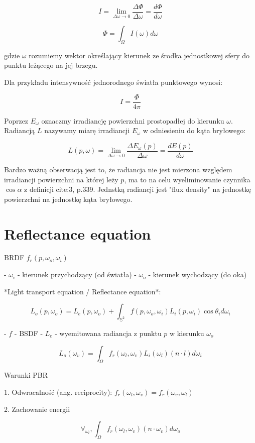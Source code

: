\documentclass[../main.tex]{subfiles}
\begin{document}
$$
I = \lim_{\Delta\omega \rightarrow 0} {
    \frac{\Delta\Phi}{\Delta\omega}
} = \frac{d\Phi}{d\omega}
$$

$$
\Phi = \int_{\Omega} {I(\omega) d\omega}
$$

gdzie $\omega$ rozumiemy wektor określający kierunek ze środka jednostkowej
sfery do punktu leżącego na jej brzegu.

Dla przykładu intensywność jednorodnego światła punktowego wynosi:

$$
I = \frac{\Phi}{4\pi}
$$

Poprzez $E_{\omega}$ oznaczmy irradiancję powierzchni prostopadłej do kierunku
$\omega$. Radiancją $L$ nazywamy miarę irradiancji $E_{\omega}$ w odniesieniu
do kąta bryłowego:

$$
L(p, \omega) = \lim_{\Delta\omega \rightarrow 0} {
  \frac{\Delta E_{\omega} (p)}{\Delta\omega}
} =
\frac{d E(p)}{d \omega}
$$

Bardzo ważną obserwacją jest to, że radiancja nie jest mierzona względem
irradiancji powierzchni na której leży $p$, ma to na celu wyeliminowanie
czynnika $\cos \alpha$ z definicji cite:3, p.339. Jednstką radiancji jest "flux
density" na jednostkę powierzchni na jednostkę kąta bryłowego.

\section{Reflectance equation}

BRDF $f_r(p, \omega_o, \omega_i)$

- $\omega_i$ - kierunek przychodzący (od światła)
- $\omega_o$ - kierunek wychodzący (do oka)

*Light transport equation / Reflectance equation*:

$$
L_o(p, \omega_o) =
  L_e(p, \omega_o) +
  \int_{\mathbb{S}^2} {
    f(p, \omega_o, \omega_i)
    L_i(p, \omega_i)
    \cos \theta_i
    d\omega_i
  }
$$

- $f$ - BSDF
- $L_e$ - wyemitowana radiancja z punktu $p$ w kierunku $\omega_o$

$$
L_o(\omega_v) = \int_{\Omega} {
    f_r(\omega_l, \omega_v)
    L_i(\omega_l)
    (n \cdot l)
    d \omega_i
}
$$

Warunki PBR

1. Odwracalność (ang. reciprocity):
	$f_r(\omega_l, \omega_v) = f_r(\omega_v, \omega_l)$

2. Zachowanie energii

$$
\forall_{\omega_l}, \int_{\Omega} {
    f_r(\omega_l, \omega_v)
    (n \cdot \omega_v) d\omega_o
}
$$
\end{document}
